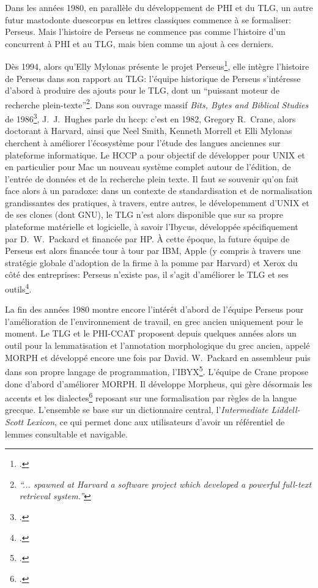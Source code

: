 Dans les années 1980, en parallèle du développement de PHI et du TLG, un autre futur mastodonte duescorpus en lettres classiques commence à se formaliser: Perseus. Mais l'histoire de Perseus ne commence pas comme l'histoire d'un concurrent à PHI et au TLG, mais bien comme un ajout à ces derniers. 


Dès 1994, alors qu'Elly Mylonas présente le projet Perseus\footcite{mylonas_perseus_1993}, elle intègre l'histoire de Perseus dans son rapport au TLG: l'équipe historique de Perseus s'intéresse d'abord à produire des ajouts pour le TLG, dont un \enquote{puissant moteur de recherche plein-texte}\footnote{\textit{\enquote{... spawned at Harvard a software project which developed a powerful full-text retrieval system.}}}. Dans son ouvrage massif \textit{Bits, Bytes and Biblical Studies} de 1986\footcite[p. 598]{hughes_bits_1987}, J.~J.~Hughes parle du \acrfull{hccp}: c'est en 1982, Gregory R.~Crane, alors doctorant à Harvard, ainsi que Neel Smith, Kenneth Morrell et Elli Mylonas cherchent à améliorer l'écosystème pour l'étude des langues anciennes sur plateforme informatique. Le HCCP a pour objectif de développer pour UNIX et en particulier pour Mac un nouveau système complet autour de l'édition, de l'entrée de données et de la recherche plein texte. Il faut se souvenir qu'on fait face alors à un paradoxe: dans un contexte de standardisation et de normalisation grandissantes des pratiques, à travers, entre autres, le dévelopemment d'UNIX et de ses clones (dont GNU), le TLG n'est alors disponible que sur sa propre plateforme matérielle et logicielle, à savoir l'Ibycus, développée spécifiquement par D.~W.~Packard et financée par HP.  À cette époque, la future équipe de Perseus est alors financée tour à tour par IBM, Apple (y compris à travers une stratégie globale d'adoption de la firme à la pomme par Harvard) et Xerox du côté des entreprises: Perseus n'existe pas, il s'agit d'améliorer le TLG et ses outils\footcite{schreibman_classics_2004}. 


La fin des années 1980 montre encore l'intérêt d'abord de l'équipe Perseus pour l'amélioration de l'environnement de travail, en grec ancien uniquement pour le moment. Le TLG et le PHI-CCAT proposent depuis quelques années alors un outil pour la lemmatisation et l'annotation morphologique du grec ancien, appelé MORPH et développé encore une fois par David. W.~Packard en assembleur puis dans son propre langage de programmation, l'IBYX\footcite[p.554-555]{hughes_bits_1987}. L'équipe de Crane propose donc d'abord d'améliorer MORPH. Il développe Morpheus, qui gère désormais les accents et les dialectes\footcite{mylonas_perseus_1993} reposant sur une formalisation par règles de la langue grecque. L'ensemble se base sur un dictionnaire central, l'\textit{Intermediate Liddell-Scott Lexicon}, ce qui permet donc aux utilisateurs d'avoir un référentiel de lemmes consultable et navigable.

